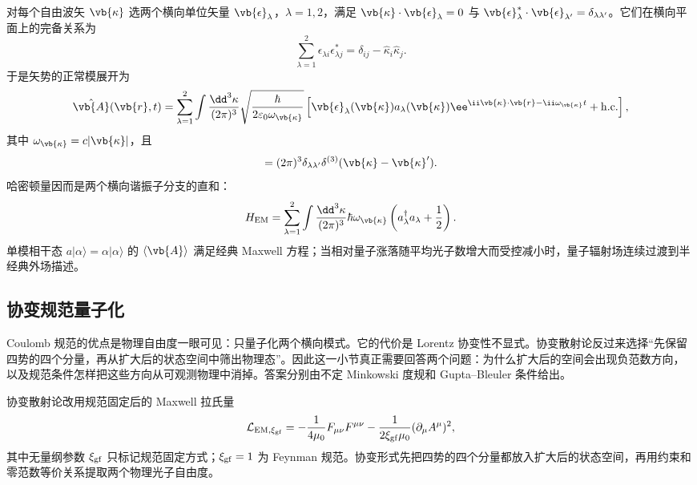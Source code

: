 对每个自由波矢 $\vb{\kappa}$ 选两个横向单位矢量 $\vb{\epsilon}_\lambda$，$\lambda=1,2$，满足 $\vb{\kappa}\cdot\vb{\epsilon}_\lambda=0$ 与 $\vb{\epsilon}_\lambda^*\cdot\vb{\epsilon}_{\lambda'}=\delta_{\lambda\lambda'}$。它们在横向平面上的完备关系为
\begin{equation*}
\sum_{\lambda=1}^2\epsilon_{\lambda i}\epsilon_{\lambda j}^*
=\delta_{ij}-\hat\kappa_i\hat\kappa_j.
\end{equation*}
于是矢势的正常模展开为
\begin{equation}
{
\hat{\vb{A}}(\vb{r},t)
=\sum_{\lambda=1}^2\int\frac{\dd^3 \kappa}{(2\pi)^3}
\sqrt{\frac{\hbar}{2\varepsilon_0\omega_{\vb{\kappa}}}}
\left[
\vb{\epsilon}_\lambda(\vb{\kappa})a_\lambda(\vb{\kappa})
 \ee^{\ii\vb{\kappa}\cdot\vb{r}-\ii\omega_{\vb{\kappa}}t}
+\mathrm{h.c.}\right],}
\label{eq:maxwell-mode-r2}
\end{equation}
其中 $\omega_{\vb{\kappa}}=c|\vb{\kappa}|$，且
\begin{equation*}
[a_\lambda(\vb{\kappa}),a_{\lambda'}^\dagger(\vb{\kappa}')]
=(2\pi)^3\delta_{\lambda\lambda'}\delta^{(3)}(\vb{\kappa}-\vb{\kappa}').
\end{equation*}
哈密顿量因而是两个横向谐振子分支的直和：
\begin{equation*}
H_{\rm EM}
=\sum_{\lambda=1}^2\int\frac{\dd^3 \kappa}{(2\pi)^3}
\hbar\omega_{\vb{\kappa}}
\left(a_\lambda^\dagger a_\lambda+\frac12\right).
\end{equation*}
单模相干态 $a|\alpha\rangle=\alpha|\alpha\rangle$ 的 $\langle\vb{A}\rangle$ 满足经典 Maxwell 方程；当相对量子涨落随平均光子数增大而受控减小时，量子辐射场连续过渡到半经典外场描述。



\subsection{协变规范量子化}

Coulomb 规范的优点是物理自由度一眼可见：只量子化两个横向模式。它的代价是 Lorentz 协变性不显式。协变散射论反过来选择“先保留四势的四个分量，再从扩大后的状态空间中筛出物理态”。因此这一小节真正需要回答两个问题：为什么扩大后的空间会出现负范数方向，以及规范条件怎样把这些方向从可观测物理中消掉。答案分别由不定 Minkowski 度规和 Gupta--Bleuler 条件给出。

协变散射论改用规范固定后的 Maxwell 拉氏量
\begin{equation}
 \mathcal L_{\rm EM,\xi_{\rm gf}}
 =-\frac1{4\mu_0}F_{\mu\nu}F^{\mu\nu}
 -\frac1{2\xi_{\rm gf}\mu_0}(\partial_\mu A^\mu)^2,
 \label{eq:cov-gauge-lagrangian-r2}
\end{equation}
其中无量纲参数 $\xi_{\rm gf}$ 只标记规范固定方式；$\xi_{\rm gf}=1$ 为 Feynman 规范。协变形式先把四势的四个分量都放入扩大后的状态空间，再用约束和零范数等价关系提取两个物理光子自由度。

